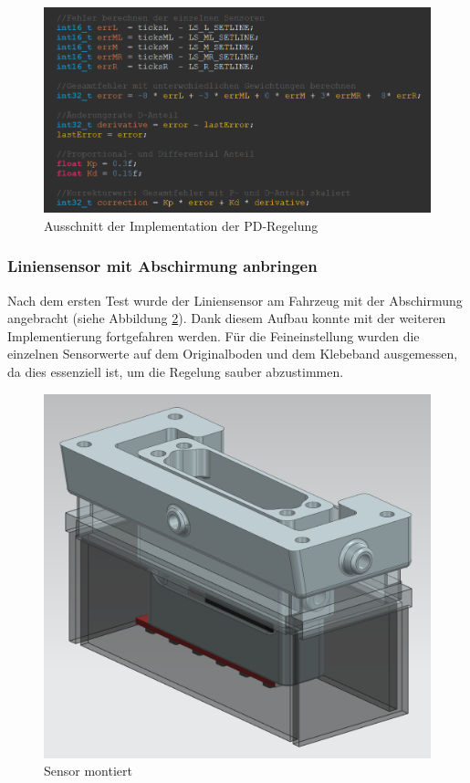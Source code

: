  \begin{figure}[H]
\centering
\includegraphics[width= \textwidth ]{assets/ET/PD-Regler/PD-Regler_Code_Pren2.png}
\caption{Ausschnitt der Implementation der PD-Regelung}
\label{fig:Ausschnitt der Implementation der PD-Regelung}
\end{figure}


\subsubsection{Liniensensor mit Abschirmung anbringen}

Nach dem ersten Test wurde der Liniensensor am Fahrzeug mit der Abschirmung angebracht (siehe Abbildung \ref{fig:enter-label}). Dank diesem Aufbau konnte mit der weiteren Implementierung fortgefahren werden. Für die Feineinstellung wurden die einzelnen Sensorwerte auf dem Originalboden und dem Klebeband ausgemessen, da dies essenziell ist, um die Regelung sauber abzustimmen.


\begin{figure}[H]
    \centering
    \includegraphics[width=0.5\linewidth]{Sensor montiert.png}
    \caption{Sensor montiert}
    \label{fig:enter-label}
\end{figure}


